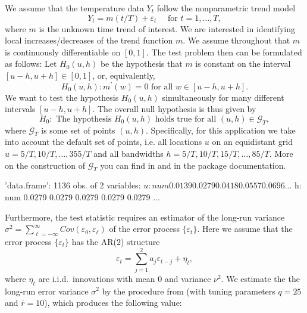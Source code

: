 \documentclass[a4paper]{scrartcl}
\begin{document}
We assume that the temperature data $Y_{t}$ follow the nonparametric trend model
\begin{equation*}
Y_{t} = m(t/T) + \varepsilon_t \quad \text{ for } t = 1, \ldots, T,
\end{equation*}
where $m$ is the unknown time trend of interest. We are interested in identifying local increases/decreases of the trend function $m$. We assume throughout that $m$ is continuously differentiable on $[0,1]$. The test problem then can be formulated as follows: Let $H_0(u,h)$ be the hypothesis that $m$ is constant on the interval $[u-h,u+h] \in [0, 1]$, or, equivalently,
\[ H_0(u,h): m^\prime(w) = 0 \text { for all } w \in [u-h,u+h]. \]
We want to test the hypothesis $H_0(u,h)$ simultaneously for many different intervals $[u-h,u+h]$. The overall null hypothesis is thus given by
\[ H_0: \text{ The hypothesis } H_0(u,h) \text{ holds true for all } (u,h) \in \mathcal{G}_T, \]
where $\mathcal{G}_T$ is some set of points $(u,h)$. Specifically, for this application we take into account the default set of points, i.e. all locations $u$ on an equidistant grid \linebreak $u = 5/T, 10/T, \ldots, 355/T$ and all bandwidths $h=5/T, 10/T, 15/T,\ldots, 85/T$. More on the construction of $\mathcal{G}_T$ you can find in \cite{KhismatullinaVogt2020a} and in the package documentation.

\begin{Schunk}
\begin{Soutput}
'data.frame':	1136 obs. of  2 variables:
 $ u: num  0.0139 0.0279 0.0418 0.0557 0.0696 ...
 $ h: num  0.0279 0.0279 0.0279 0.0279 0.0279 ...
\end{Soutput}
\end{Schunk}

Furthermore, the test statistic requires an estimator of the long-run variance \linebreak $\sigma^2 = \sum_{\ell=-\infty}^{\infty} Cov(\varepsilon_0, \varepsilon_{\ell})$ of the error process $\{ \varepsilon_t \}$. Here we assume that the error process $\{ \varepsilon_t \}$ has the AR($2$) structure 
\begin{equation*}
\varepsilon_t = \sum_{j=1}^{2} a_j \varepsilon_{t-j} + \eta_t,
\end{equation*}
where $\eta_t$ are i.i.d.\ innovations with mean $0$ and variance $\nu^2$. We estimate the the long-run error variance $\sigma^2$ by the procedure from \cite{KhismatullinaVogt2020a} (with tuning parameters $q = 25$ and $ = 10$), which produces the following value:
\end{document}
